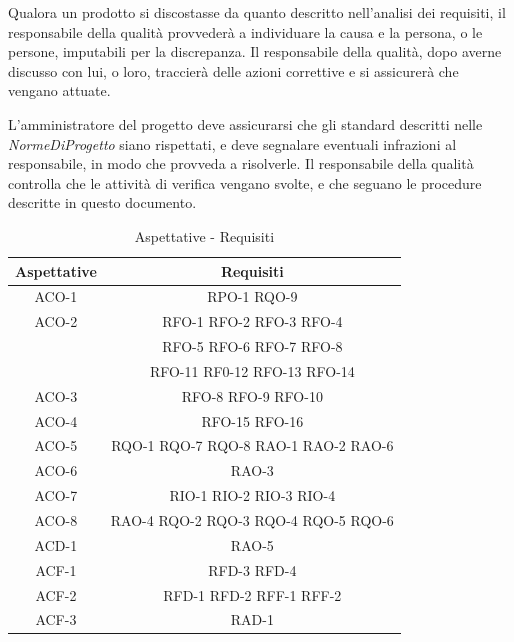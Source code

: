 Qualora un prodotto si discostasse da quanto descritto nell'analisi dei requisiti, il responsabile della qualit\`a provveder\`a a individuare la causa e la persona, o le persone, imputabili per la discrepanza. Il responsabile della qualit\`a, dopo averne discusso con lui, o loro, traccier\`a delle azioni correttive e si assicurer\`a che vengano attuate.

L'amministratore del progetto deve assicurarsi che gli standard descritti nelle \textit{NormeDiProgetto} siano rispettati, e deve segnalare eventuali infrazioni al responsabile, in modo che provveda a risolverle. Il responsabile della qualit\`a controlla che le attivit\`a di verifica vengano svolte, e che seguano le procedure descritte in questo documento.
\newpage


\begin{table}[h]
\begin{center}
     \begin{tabular}
           {@{\extracolsep{\fill}}|c|c|}
     \hline
      \textbf{Aspettative} & \textbf{Requisiti} \\
      \hline
     ACO-1 & RPO-1 RQO-9 \\
     \hline
     ACO-2 & RFO-1 RFO-2 RFO-3 RFO-4\\ & RFO-5 RFO-6 RFO-7 RFO-8\\ & RFO-11 RF0-12 RFO-13 RFO-14 \\
     \hline
     ACO-3 & RFO-8 RFO-9 RFO-10 \\
     \hline
     ACO-4 & RFO-15 RFO-16 \\
     \hline
     ACO-5 & RQO-1 RQO-7 RQO-8 RAO-1 RAO-2 RAO-6 \\
     \hline
     ACO-6 & RAO-3 \\
     \hline
     ACO-7 & RIO-1 RIO-2 RIO-3 RIO-4 \\
     \hline
     ACO-8 & RAO-4 RQO-2 RQO-3 RQO-4 RQO-5 RQO-6 \\
     \hline
     ACD-1 & RAO-5 \\
     \hline
     ACF-1 & RFD-3 RFD-4 \\
     \hline
     ACF-2 & RFD-1 RFD-2 RFF-1 RFF-2 \\
     \hline
     ACF-3 & RAD-1 \\
    \hline %
    \end{tabular}
  \caption{Aspettative - Requisiti} %
  \label{tab:aspettative}
  \end{center}
\end{table}
 \newpage
 
